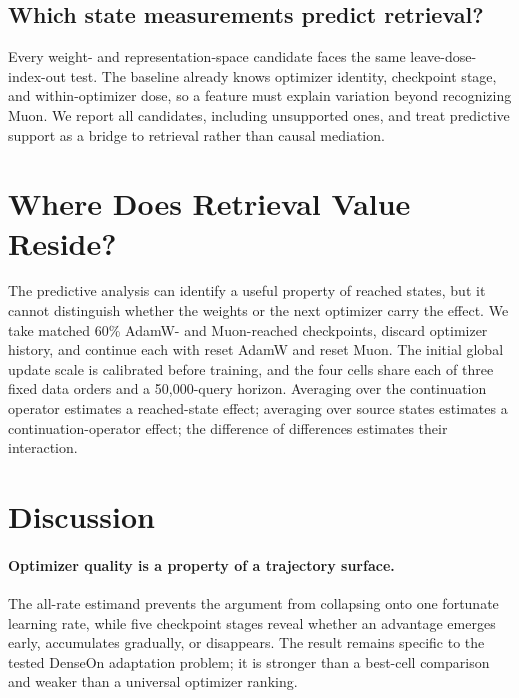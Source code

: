 \documentclass[11pt]{article}
\begin{document}
\DimensionUtilizationFinding

\DimensionUtilizationFigure

\subsection{Which state measurements predict retrieval?}

Every weight- and representation-space candidate faces the same leave-dose-index-out test. The
baseline already knows optimizer identity, checkpoint stage, and within-optimizer dose, so a feature
must explain variation beyond recognizing Muon. We report all candidates, including unsupported
ones, and treat predictive support as a bridge to retrieval rather than causal mediation.

\CorrectedGeometryBridgeFinding

\DimensionRetrievalBridgeFinding

\section{Where Does Retrieval Value Reside?}

The predictive analysis can identify a useful property of reached states, but it cannot distinguish
whether the weights or the next optimizer carry the effect. We take matched 60\% AdamW- and
Muon-reached checkpoints, discard optimizer history, and continue each with reset AdamW and reset
Muon. The initial global update scale is calibrated before training, and the four cells share each
of three fixed data orders and a 50,000-query horizon. Averaging over the continuation operator
estimates a reached-state effect; averaging over source states estimates a continuation-operator
effect; the difference of differences estimates their interaction.

\StateOperatorMechanismFinding

\section{Discussion}

\paragraph{Optimizer quality is a property of a trajectory surface.}
The all-rate estimand prevents the argument from collapsing onto one fortunate learning rate, while
five checkpoint stages reveal whether an advantage emerges early, accumulates gradually, or
disappears. The result remains specific to the tested DenseOn adaptation problem; it is stronger
than a best-cell comparison and weaker than a universal optimizer ranking.
\end{document}
